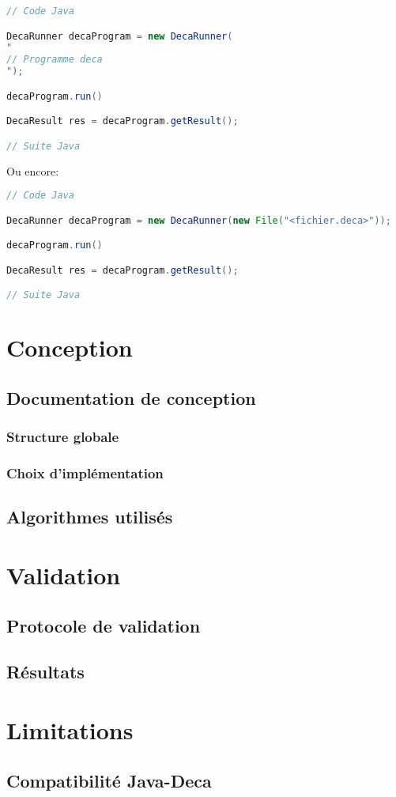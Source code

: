 \documentclass[12pt, a4paper, one side]{article}
\begin{document}
\begin{lstlisting}[language=java]
// Code Java

DecaRunner decaProgram = new DecaRunner(
"
// Programme deca
");

decaProgram.run()

DecaResult res = decaProgram.getResult();

// Suite Java
\end{lstlisting}

 Ou encore:
\begin{lstlisting}[language=java]
// Code Java

DecaRunner decaProgram = new DecaRunner(new File("<fichier.deca>"));

decaProgram.run()

DecaResult res = decaProgram.getResult();

// Suite Java
\end{lstlisting}

\section{Conception}
    \subsection{Documentation de conception}
        \subsubsection{Structure globale}
        \subsubsection{Choix d'implémentation}
    \subsection{Algorithmes utilisés}

\section{Validation}
    \subsection{Protocole de validation}
    \subsection{Résultats}

\section{Limitations}
    \subsection{Compatibilité Java-Deca}

\printbibliography
\end{document}
